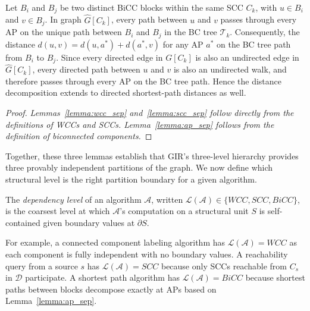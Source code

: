 \begin{lemma}[AP separation]
\label{lemma:ap_sep}
Let $B_i$ and $B_j$ be two distinct BiCC blocks within the same SCC $C_k$,
with $u \in B_i$ and $v \in B_j$.
In graph $\hat{G}[C_k]$,
every path between $u$ and $v$ passes through every AP
on the unique path between $B_i$ and $B_j$ in the BC tree $\mathcal{T}_k$.
Consequently, the distance $d(u, v) = d(u, a^*) + d(a^*, v)$
for any AP $a^*$ on the BC tree path from $B_i$ to $B_j$.
Since every directed edge in $G[C_k]$ is also an undirected edge in $\hat{G}[C_k]$,
every directed path between $u$ and $v$ is also an undirected walk,
and therefore passes through every AP on the BC tree path.
Hence the distance decomposition extends to directed shortest-path distances as well.
\end{lemma}

\begin{proof}

\textit{Lemmas~\ref{lemma:wcc_sep} and~\ref{lemma:scc_sep} follow directly from
the definitions of WCCs and SCCs.
Lemma~\ref{lemma:ap_sep} follows from the definition of biconnected components.}
\end{proof}

Together, these three lemmas establish that GIR's three-level hierarchy
provides three provably independent partitions of the graph.
We now define which structural level is the right partition boundary
for a given algorithm.

\begin{definition}
\label{def:dep_level}
The \textit{dependency level} of an algorithm $\mathcal{A}$,
written $\mathcal{L}(\mathcal{A})$$\in$$\{\textit{WCC}, \textit{SCC}, \textit{BiCC}\}$,
is the coarsest level at which $\mathcal{A}$'s computation
on a structural unit $S$ is self-contained given boundary values at $\partial S$.
\end{definition}

For example, a connected component labeling algorithm has
$\mathcal{L}(\mathcal{A}) = \textit{WCC}$ as
each component is fully independent with no boundary values.
A reachability query from a source $s$ has $\mathcal{L}(\mathcal{A}) = \textit{SCC}$ because only SCCs reachable from $C_s$ in $\mathcal{D}$ participate.
A shortest path algorithm has $\mathcal{L}(\mathcal{A}) = \textit{BiCC}$ because shortest paths between blocks
decompose exactly at APs based on Lemma~\ref{lemma:ap_sep}.


